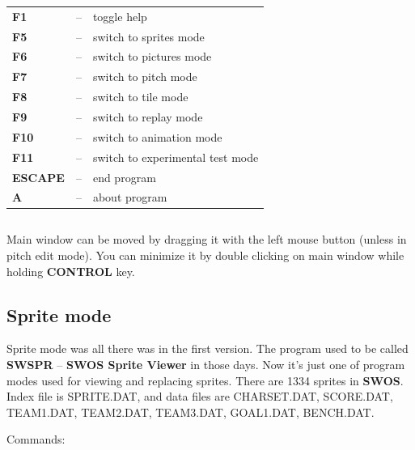 \documentclass[a4paper,12pt]{article}
\begin{document}
\vspace{\baselineskip}

\begin{tabular}{lll}
{\bf F1}          &--& toggle help\\
{\bf F5}          &--& switch to sprites mode\\
{\bf F6}          &--& switch to pictures mode\\
{\bf F7}          &--& switch to pitch mode\\
{\bf F8}          &--& switch to tile mode\\
{\bf F9}          &--& switch to replay mode\\
{\bf F10}         &--& switch to animation mode\\
{\bf F11}         &--& switch to experimental test mode\\
{\bf ESCAPE}      &--& end program\\
{\bf A}           &--& about program\\
\end{tabular}

\begin{verbatim}
\end{verbatim}

Main window can be moved by dragging it with the left mouse button (unless in pitch edit mode). You can minimize it by double clicking on main window while holding {\bf CONTROL} key.

\newpage
\subsection{Sprite mode}

Sprite mode was all there was in the first version. The program used to be called {\bf SWSPR} -- {\bf SWOS Sprite Viewer} in those days. Now it's just one of program modes used for viewing and replacing sprites. There are 1334 sprites
in {\bf SWOS}. Index file is SPRITE.DAT, and data files are CHARSET.DAT, SCORE.DAT,
TEAM1.DAT, TEAM2.DAT, TEAM3.DAT, GOAL1.DAT, BENCH.DAT.

\vspace{\baselineskip}

\noindent Commands:

\vspace{\baselineskip}
\end{document}
